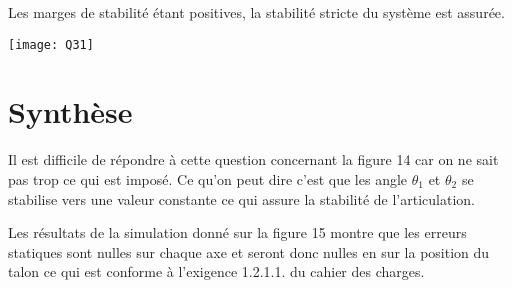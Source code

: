
\ifprof\begin{corrige}
Les marges de stabilité étant positives, la stabilité stricte du système est assurée. 
\begin{center}
\texttt{[image: Q31]}
\end{center}
\end{corrige}\else\fi

\section{Synthèse}


\ifprof\begin{corrige}
Il est difficile de répondre à cette question concernant la figure 14 car on ne sait pas trop ce qui est imposé.
Ce qu'on peut dire c'est que les angle $\theta_1$ et $\theta_2$ se stabilise vers une valeur constante ce qui assure la stabilité de l'articulation.

Les résultats de la simulation donné sur la figure 15 montre que les erreurs statiques sont nulles sur chaque axe et seront donc nulles en sur la position du talon ce qui est conforme à l'exigence 1.2.1.1. du cahier des charges.

\end{corrige}\else\fi

